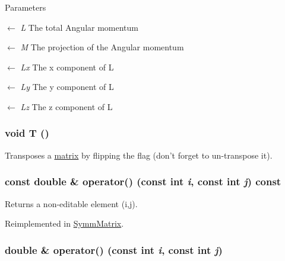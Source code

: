 \begin{DoxyParams}{Parameters}
\item[\mbox{$\leftarrow$} {\em L}]The total Angular momentum \item[\mbox{$\leftarrow$} {\em M}]The projection of the Angular momentum \item[\mbox{$\leftarrow$} {\em Lx}]The x component of L \item[\mbox{$\leftarrow$} {\em Ly}]The y component of L \item[\mbox{$\leftarrow$} {\em Lz}]The z component of L \end{DoxyParams}
\hypertarget{classJKBuilder_1_1matrix_af2563817f6505e9f8a6ee5c5c209a115}{
\subsubsection[{T}]{\setlength{\rightskip}{0pt plus 5cm}void T ()}}
\label{classJKBuilder_1_1matrix_af2563817f6505e9f8a6ee5c5c209a115}


Transposes a \hyperlink{classJKBuilder_1_1matrix}{matrix} by flipping the flag (don't forget to un-\/transpose it). \hypertarget{classJKBuilder_1_1matrix_a9ccbac42f4eefb704f04886001f4fb3e}{
\subsubsection[{operator()}]{\setlength{\rightskip}{0pt plus 5cm}const double \& operator() (const int {\em i}, \/  const int {\em j}) const}}
\label{classJKBuilder_1_1matrix_a9ccbac42f4eefb704f04886001f4fb3e}


Returns a non-\/editable element (i,j). 

Reimplemented in \hyperlink{classJKBuilder_1_1SymmMatrix_a9ccbac42f4eefb704f04886001f4fb3e}{SymmMatrix}.\hypertarget{classJKBuilder_1_1matrix_a3d7fca183ff1c9f4c160218746f2ef31}{
\subsubsection[{operator()}]{\setlength{\rightskip}{0pt plus 5cm}double \& operator() (const int {\em i}, \/  const int {\em j})}}
\label{classJKBuilder_1_1matrix_a3d7fca183ff1c9f4c160218746f2ef31}


